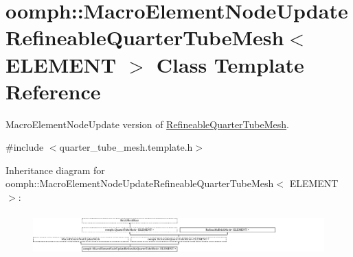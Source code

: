 \hypertarget{classoomph_1_1MacroElementNodeUpdateRefineableQuarterTubeMesh}{}\section{oomph\+:\+:Macro\+Element\+Node\+Update\+Refineable\+Quarter\+Tube\+Mesh$<$ E\+L\+E\+M\+E\+NT $>$ Class Template Reference}
\label{classoomph_1_1MacroElementNodeUpdateRefineableQuarterTubeMesh}


Macro\+Element\+Node\+Update version of \hyperlink{classoomph_1_1RefineableQuarterTubeMesh}{Refineable\+Quarter\+Tube\+Mesh}.  




{\ttfamily \#include $<$quarter\+\_\+tube\+\_\+mesh.\+template.\+h$>$}

Inheritance diagram for oomph\+:\+:Macro\+Element\+Node\+Update\+Refineable\+Quarter\+Tube\+Mesh$<$ E\+L\+E\+M\+E\+NT $>$\+:\begin{figure}[H]
\begin{center}
\leavevmode
\includegraphics[height=1.630277cm]{classoomph_1_1MacroElementNodeUpdateRefineableQuarterTubeMesh}
\end{center}
\end{figure}
